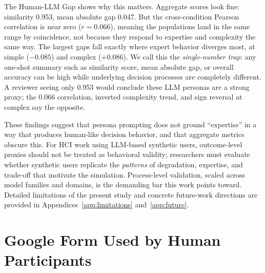 \documentclass[manuscript,review]{acmart}
\begin{document}
The Human-LLM Gap shows why this matters. Aggregate scores look fine: similarity 0.953, mean absolute gap 0.047. But the cross-condition Pearson correlation is near zero ($r = 0.066$), meaning the populations land in the same range by coincidence, not because they respond to expertise and complexity the same way. The largest gaps fall exactly where expert behavior diverges most, at simple ($-0.085$) and complex ($+0.086$). We call this the \emph{single-number trap}: any one-shot summary such as similarity score, mean absolute gap, or overall accuracy can be high while underlying decision processes are completely different. A reviewer seeing only 0.953 would conclude these LLM personas are a strong proxy; the 0.066 correlation, inverted complexity trend, and sign reversal at complex say the opposite.

These findings suggest that persona prompting does not ground ``expertise'' in a way that produces human-like decision behavior, and that aggregate metrics obscure this. For HCI work using LLM-based synthetic users, outcome-level proxies should not be treated as behavioral validity; researchers must evaluate whether synthetic users replicate the \emph{patterns} of degradation, expertise, and trade-off that motivate the simulation. Process-level validation, scaled across model families and domains, is the demanding bar this work points toward. Detailed limitations of the present study and concrete future-work directions are provided in Appendices~\ref{app:limitations} and~\ref{app:future}.





\appendix

\section{Google Form Used by Human Participants}\label{app:google-form}
\end{document}
